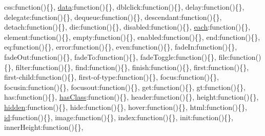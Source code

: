 \begin{DoxyCompactItemize}
\textquotesingle{}css\textquotesingle{}\+:function()\{\}, \textquotesingle{}\hyperlink{jquery_8unobtrusive-ajax_8min_8js_a8f172ae31c11770303ca0c4cb48ceb3a}{data}\textquotesingle{}\+:function()\{\}, \textquotesingle{}dblclick\textquotesingle{}\+:function()\{\}, \textquotesingle{}delay\textquotesingle{}\+:function()\{\}, \textquotesingle{}delegate\textquotesingle{}\+:function()\{\}, \textquotesingle{}dequeue\textquotesingle{}\+:function()\{\}, \textquotesingle{}descendant\textquotesingle{}\+:function()\{\}, \textquotesingle{}detach\textquotesingle{}\+:function()\{\}, \textquotesingle{}die\textquotesingle{}\+:function()\{\}, \textquotesingle{}disabled\textquotesingle{}\+:function()\{\}, \textquotesingle{}\hyperlink{_scripts_2jquery-1_810_82_8min_8js_af24c9ea1e34372f8c8b312b35586008d}{each}\textquotesingle{}\+:function()\{\}, \textquotesingle{}element\textquotesingle{}\+:function()\{\}, \textquotesingle{}empty\textquotesingle{}\+:function()\{\}, \textquotesingle{}enabled\textquotesingle{}\+:function()\{\}, \textquotesingle{}end\textquotesingle{}\+:function()\{\}, \textquotesingle{}eq\textquotesingle{}\+:function()\{\}, \textquotesingle{}error\textquotesingle{}\+:function()\{\}, \textquotesingle{}even\textquotesingle{}\+:function()\{\}, \textquotesingle{}fade\+In\textquotesingle{}\+:function()\{\}, \textquotesingle{}fade\+Out\textquotesingle{}\+:function()\{\}, \textquotesingle{}fade\+To\textquotesingle{}\+:function()\{\}, \textquotesingle{}fade\+Toggle\textquotesingle{}\+:function()\{\}, \textquotesingle{}file\textquotesingle{}\+:function()\{\}, \textquotesingle{}filter\textquotesingle{}\+:function()\{\}, \textquotesingle{}find\textquotesingle{}\+:function()\{\}, \textquotesingle{}finish\textquotesingle{}\+:function()\{\}, \textquotesingle{}first\textquotesingle{}\+:function()\{\}, \textquotesingle{}first-\/child\textquotesingle{}\+:function()\{\}, \textquotesingle{}first-\/of-\/type\textquotesingle{}\+:function()\{\}, \textquotesingle{}focus\textquotesingle{}\+:function()\{\}, \textquotesingle{}focusin\textquotesingle{}\+:function()\{\}, \textquotesingle{}focusout\textquotesingle{}\+:function()\{\}, \textquotesingle{}get\textquotesingle{}\+:function()\{\}, \textquotesingle{}gt\textquotesingle{}\+:function()\{\}, \textquotesingle{}has\textquotesingle{}\+:function()\{\}, \textquotesingle{}\hyperlink{_scripts_2bootstrap_8min_8js_a8def0d8d5e720a12b6d5be36ad348855}{has\+Class}\textquotesingle{}\+:function()\{\}, \textquotesingle{}header\textquotesingle{}\+:function()\{\}, \textquotesingle{}height\textquotesingle{}\+:function()\{\}, \textquotesingle{}\hyperlink{_scripts_2jquery-1_810_82_8min_8js_a086b6295ec8d15f090cd7239137a4979}{hidden}\textquotesingle{}\+:function()\{\}, \textquotesingle{}hide\textquotesingle{}\+:function()\{\}, \textquotesingle{}hover\textquotesingle{}\+:function()\{\}, \textquotesingle{}html\textquotesingle{}\+:function()\{\}, \textquotesingle{}\hyperlink{_facebook_8js_a9b3d01084d4285e8b0289ee3f959999b}{id}\textquotesingle{}\+:function()\{\}, \textquotesingle{}image\textquotesingle{}\+:function()\{\}, \textquotesingle{}index\textquotesingle{}\+:function()\{\}, \textquotesingle{}init\textquotesingle{}\+:function()\{\}, \textquotesingle{}inner\+Height\textquotesingle{}\+:function()\{\}, 
\end{DoxyCompactItemize}
